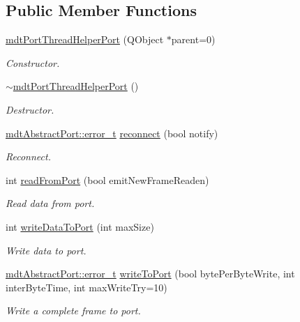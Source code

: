 \subsection*{Public Member Functions}
\begin{DoxyCompactItemize}
\item 
\hypertarget{classmdt_port_thread_helper_port_ab037d6f41e9f19145f06a964701181a3}{
\hyperlink{classmdt_port_thread_helper_port_ab037d6f41e9f19145f06a964701181a3}{mdtPortThreadHelperPort} (QObject $\ast$parent=0)}
\label{classmdt_port_thread_helper_port_ab037d6f41e9f19145f06a964701181a3}

\begin{DoxyCompactList}\small\item\em Constructor. \end{DoxyCompactList}\item 
\hypertarget{classmdt_port_thread_helper_port_afd9117d9a6b4f6769fc3ab0c9fa4a1e8}{
\hyperlink{classmdt_port_thread_helper_port_afd9117d9a6b4f6769fc3ab0c9fa4a1e8}{$\sim$mdtPortThreadHelperPort} ()}
\label{classmdt_port_thread_helper_port_afd9117d9a6b4f6769fc3ab0c9fa4a1e8}

\begin{DoxyCompactList}\small\item\em Destructor. \end{DoxyCompactList}\item 
\hyperlink{classmdt_abstract_port_ad4121bb930c95887e77f8bafa065a85e}{mdtAbstractPort::error\_\-t} \hyperlink{classmdt_port_thread_helper_port_a0404d78ce7372c4732e48197d4e88e3c}{reconnect} (bool notify)
\begin{DoxyCompactList}\small\item\em Reconnect. \end{DoxyCompactList}\item 
int \hyperlink{classmdt_port_thread_helper_port_a9b908f7675a9f5ab28f306bba282f68f}{readFromPort} (bool emitNewFrameReaden)
\begin{DoxyCompactList}\small\item\em Read data from port. \end{DoxyCompactList}\item 
int \hyperlink{classmdt_port_thread_helper_port_a1d5cda8a61575825c3acd8b72f00fc6f}{writeDataToPort} (int maxSize)
\begin{DoxyCompactList}\small\item\em Write data to port. \end{DoxyCompactList}\item 
\hyperlink{classmdt_abstract_port_ad4121bb930c95887e77f8bafa065a85e}{mdtAbstractPort::error\_\-t} \hyperlink{classmdt_port_thread_helper_port_a25c35855dc9e8edc489a9efad8d293f7}{writeToPort} (bool bytePerByteWrite, int interByteTime, int maxWriteTry=10)
\begin{DoxyCompactList}\small\item\em Write a complete frame to port. \end{DoxyCompactList}\end{DoxyCompactItemize}


